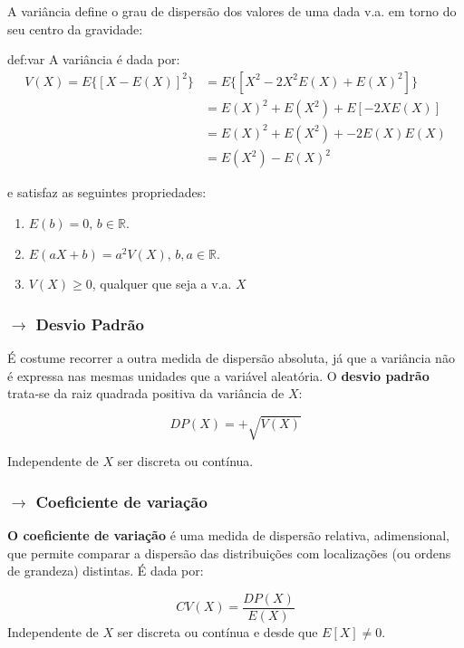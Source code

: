 \noindent A variância define o grau de dispersão dos valores de uma dada v.a. em torno do seu centro da gravidade:

\begin{theo}{def:var}\label{def:var}
\noindent A variância é dada por:
    \begin{align*}
        V(X) = E\{[X - E(X)]^2\} &= E\{[X^2 - 2X^2E(X) + E(X)^2]\}\\
        &= E(X)^2 + E(X^2) + E[-2XE(X)]\\
        &= E(X)^2 + E(X^2) + -2E(X)E(X)\\
        &= E(X^2) - E(X)^2 
    \end{align*}

\noindent e satisfaz as seguintes propriedades:

\begin{enumerate} 
    \item $E(b) = 0,\, b\in \mathbb{R}$.
    \item $E(aX + b) = a^2V(X),\, b,a\in \mathbb{R}$.
    \item $V(X) \ge 0$, qualquer que seja a v.a. $X$
\end{enumerate}
\end{theo}

\subsubsection[2.2.4 Desvio Padrão]{$\pmb{\rightarrow}$ Desvio Padrão}

\noindent É costume recorrer a outra medida de dispersão absoluta, já que a variância não é expressa nas mesmas unidades que a variável aleatória. O \textbf{desvio padrão} trata-se da raiz quadrada positiva da variância de $X$:

$$
    \boxed{DP(X) = + \sqrt{V(X)}}
$$

\noindent Independente de $X$ ser discreta ou contínua.

\subsubsection[2.2.5 Coeficiente de variação]{$\pmb{\rightarrow}$ Coeficiente de variação}

\noindent \textbf{O coeficiente de variação} é uma medida de dispersão relativa, adimensional, que permite comparar a dispersão das distribuições com localizações (ou ordens de grandeza) distintas. É dada por:

$$
    \boxed{CV(X) = \dfrac{DP(X)}{E(X)}}
$$
\noindent Independente de $X$ ser discreta ou contínua e desde que $E[X] \ne 0$. 

